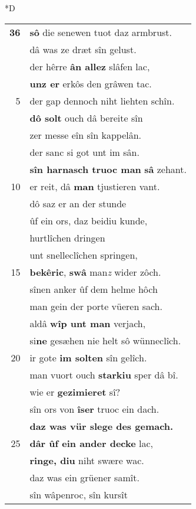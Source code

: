 \documentclass[8pt,a4paper,notitlepage]{article}
\begin{document}
\begin{table}[ht]
\begin{minipage}[t]{0.5\linewidth}
\small
\begin{center}*D
\end{center}
\begin{tabular}{rl}
\textbf{36} & \textbf{sô} die senewen tuot daz armbrust.\\ 
 & dâ was ze dræt sîn gelust.\\ 
 & der hêrre \textbf{ân allez} slâfen lac,\\ 
 & \textbf{unz er} erkôs den grâwen tac.\\ 
5 & der gap dennoch niht liehten schîn.\\ 
 & \textbf{dô solt} ouch dâ bereite sîn\\ 
 & zer messe eîn sîn kappelân.\\ 
 & der sanc si got unt im sân.\\ 
 & \textbf{sîn harnasch truoc man} \textbf{sâ} zehant.\\ 
10 & er reit, dâ \textbf{man} tjustieren vant.\\ 
 & dô saz er an der stunde\\ 
 & ûf ein ors, daz beidiu kunde,\\ 
 & hurtlîchen dringen\\ 
 & unt snelleclîchen springen,\\ 
15 & \textbf{bekêric}, \textbf{swâ} man\textit{z} wider zôch.\\ 
 & sînen anker ûf dem helme hôch\\ 
 & man gein der porte vüeren sach.\\ 
 & aldâ \textbf{wîp unt man} verjach,\\ 
 & si\textbf{ne} gesæhen nie helt sô wünneclîch.\\ 
20 & ir gote \textbf{im solten} sîn gelîch.\\ 
 & man vuort ouch \textbf{starkiu} sper dâ bî.\\ 
 & wie er \textbf{gezimieret} sî?\\ 
 & sîn ors von \textbf{îser} truoc ein dach.\\ 
 & \textbf{daz was vür slege des gemach.}\\ 
25 & \textbf{dâr ûf ein ander decke} lac,\\ 
 & \textbf{ringe, diu} niht swære wac.\\ 
 & daz was ein grüener samît.\\ 
 & sîn wâpenroc, sîn kursît\\ 

\end{tabular}
\end{minipage}
\end{table}
\end{document}
